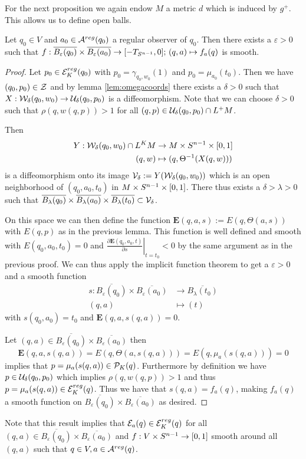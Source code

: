 For the next proposition we again endow $M$ a metric $d$ which is induced by $g^+$. This allows us to define open balls.
\begin{proposition}\label{prop:fsmooth}
    Let $q_0\in V$ and $a_0\in {{\mathcal{A}}^{reg}}(q_0)$ a regular observer of $q_0$. Then there exists a $\varepsilon>0$ such that $f:\overline{B_\varepsilon(q_0)}\times \overline{B_\varepsilon(a_0)} \to [-T_{S^{n-1}},0]; \, (q,a)\mapsto f_a(q)$ is smooth.
\end{proposition}
\begin{proof}
    Let $p_0 \in {{\mathcal{E}}^{reg}_K}(q_0)$ with $p_0 = \gamma_{q_0,w_0}(1)$ and $p_0 = \mu_{a_0}(t_0)$. Then we have $(q_0,p_0)\in {\mathcal{Z}}$ and by lemma \ref{lem:omegacoords} there exists a $\delta>0$ such that $X:{\mathcal{W}}_\delta(q_0,w_0)\to {\mathcal{U}}_\delta(q_0,p_0)$ is a diffeomorphism. Note that we can choose $\delta>0$ such that $\rho(q,w(q,p))>1$ for all $(q,p)\in {\mathcal{U}}_\delta(q_0,p_0) \cap L^+M$.

    Then 
    \begin{align*}
        Y:{\mathcal{W}}_\delta(q_0,w_0) \cap L^KM&\to M\times {S^{n-1}} \times [0,1]\\
        (q,w) &\mapsto (q,\Theta^{-1}(X(q,w)))
    \end{align*} 
    is a diffeomorphism onto its image ${\mathcal{V}}_\delta:=Y({\mathcal{W}}_\delta(q_0,w_0))$  which is an open neighborhood of $(q_0,a_0,t_0)$ in $M\times {S^{n-1}} \times [0,1]$. There thus exists a $\delta > \lambda>0$ such that $\overline{B_\lambda(q_0)}\times\overline{B_\lambda(a_0)} \times\overline{B_\lambda(t_0)} \subset {\mathcal{V}}_\delta$.

    On this space we can then define the function $\mathbf{E}(q,a,s):=E(q,\Theta(a,s))$ with $E(q,p)$ as in the previous lemma. This function is well defined and smooth with $E(q_0,a_0,t_0)=0$ and $\left.\frac{\partial\mathbf{E}(q_0,a_0,t)}{\partial s}\right\rvert_{t=t_0} < 0$ by the same argument as in the previous proof. We can thus apply the implicit function theorem to get a $\varepsilon>0$ and a smooth function 
    \begin{align*}
        s:\overline{B_\varepsilon(q_0)}\times\overline{B_\varepsilon(a_0)} &\to \overline{B_\lambda(t_0)}\\
        (q,a)&\mapsto (t)
    \end{align*} with $s(q_0,a_0)=t_0$ and $\mathbf{E}(q,a,s(q,a))=0$.

    Let $(q,a) \in \overline{B_\varepsilon(q_0)}\times\overline{B_\varepsilon(a_0)}$ then 
    \[
        \mathbf{E}(q,a,s(q,a))=E(q,\Theta(a,s(q,a))) = E(q,\mu_a(s(q,a))) = 0
    \] 
    implies that $p=\mu_a(s(q,a))\in {\mathcal{P}}_K(q)$. Furthermore by definition we have $p\in {\mathcal{U}}_\delta(q_0,p_0)$ which implies $\rho(q,w(q,p))>1$ and thus $p=\mu_a(s(q,a))\in {{\mathcal{E}}^{reg}_K}(q)$. Thus we have that $s(q,a)=f_a(q)$, making $f_a(q)$ a smooth function on $\overline{B_\varepsilon(q_0)}\times\overline{B_\varepsilon(a_0)}$ as desired.
\end{proof} 
Note that this result implies that ${\mathcal{E}}_a(q)\in {{\mathcal{E}}^{reg}_K}(q)$ for all $(q,a)\in \overline{B_\varepsilon(q_0)}\times\overline{B_\varepsilon(a_0)}$ and $f:V\times {S^{n-1}} \to [0,1]$ smooth around all $(q,a)$ such that $q\in V, a\in {{\mathcal{A}}^{reg}}(q)$.

